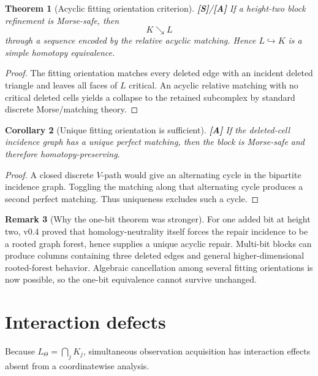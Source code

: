 \documentclass[11pt]{article}
\newtheorem{theorem}{Theorem}[section]
\newtheorem{corollary}[theorem]{Corollary}
\theoremstyle{definition}
\newtheorem{remark}[theorem]{Remark}
\newcommand{\statusS}{\textbf{[S]}}
\newcommand{\statusA}{\textbf{[A]}}
\begin{document}
\begin{theorem}[Acyclic fitting orientation criterion]\label{thm:morsesafe}
\statusS/\statusA\;
If a height-two block refinement is Morse-safe, then
\[
K\searrow L
\]
through a sequence encoded by the relative acyclic matching. Hence $L\hookrightarrow K$ is a simple homotopy equivalence.
\end{theorem}

\begin{proof}
The fitting orientation matches every deleted edge with an incident deleted triangle and leaves all faces of $L$ critical. An acyclic relative matching with no critical deleted cells yields a collapse to the retained subcomplex by standard discrete Morse/matching theory.
\end{proof}

\begin{corollary}[Unique fitting orientation is sufficient]\label{cor:unique}
\statusA\;
If the deleted-cell incidence graph has a unique perfect matching, then the block is Morse-safe and therefore homotopy-preserving.
\end{corollary}

\begin{proof}
A closed discrete $V$-path would give an alternating cycle in the bipartite incidence graph. Toggling the matching along that alternating cycle produces a second perfect matching. Thus uniqueness excludes such a cycle.
\end{proof}

\begin{remark}[Why the one-bit theorem was stronger]
For one added bit at height two, v0.4 proved that homology-neutrality itself forces the repair incidence to be a rooted graph forest, hence supplies a unique acyclic repair. Multi-bit blocks can produce columns containing three deleted edges and general higher-dimensional rooted-forest behavior. Algebraic cancellation among several fitting orientations is now possible, so the one-bit equivalence cannot survive unchanged.
\end{remark}

\section{Interaction defects}\label{sec:interaction}

Because $L_\Theta=\bigcap_jK_j$, simultaneous observation acquisition has interaction effects absent from a coordinatewise analysis.
\end{document}
